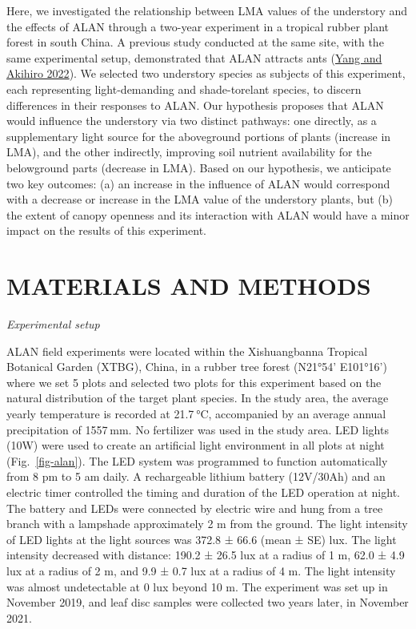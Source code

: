 \documentclass[
  12pt,
  letterpaper,
  DIV=11,
  numbers=noendperiod]{scrartcl}
\begin{document}
Here, we investigated the relationship between LMA values of the
understory and the effects of ALAN through a two-year experiment in a
tropical rubber plant forest in south China. A previous study conducted
at the same site, with the same experimental setup, demonstrated that
ALAN attracts ants (\protect\hyperlink{ref-Yang2022}{Yang and Akihiro
2022}). We selected two understory species as subjects of this
experiment, each representing light-demanding and shade-torelant
species, to discern differences in their responses to ALAN. Our
hypothesis proposes that ALAN would influence the understory via two
distinct pathways: one directly, as a supplementary light source for the
aboveground portions of plants (increase in LMA), and the other
indirectly, improving soil nutrient availability for the belowground
parts (decrease in LMA). Based on our hypothesis, we anticipate two key
outcomes: (a) an increase in the influence of ALAN would correspond with
a decrease or increase in the LMA value of the understory plants, but
(b) the extent of canopy openness and its interaction with ALAN would
have a minor impact on the results of this experiment.

\hypertarget{materials-and-methods}{%
\section{MATERIALS AND METHODS}\label{materials-and-methods}}

\emph{Experimental setup}

ALAN field experiments were located within the Xishuangbanna Tropical
Botanical Garden (XTBG), China, in a rubber tree forest (N21°54'
E101°16') where we set 5 plots and selected two plots for this
experiment based on the natural distribution of the target plant
species. In the study area, the average yearly temperature is recorded
at 21.7 °C, accompanied by an average annual precipitation of 1557 mm.
No fertilizer was used in the study area. LED lights (10W) were used to
create an artificial light environment in all plots at night
(Fig.~\ref{fig-alan}). The LED system was programmed to function
automatically from 8 pm to 5 am daily. A rechargeable lithium battery
(12V/30Ah) and an electric timer controlled the timing and duration of
the LED operation at night. The battery and LEDs were connected by
electric wire and hung from a tree branch with a lampshade approximately
2 m from the ground. The light intensity of LED lights at the light
sources was 372.8 ± 66.6 (mean ± SE) lux. The light intensity decreased
with distance: 190.2 ± 26.5 lux at a radius of 1 m, 62.0 ± 4.9 lux at a
radius of 2 m, and 9.9 ± 0.7 lux at a radius of 4 m. The light intensity
was almost undetectable at 0 lux beyond 10 m. The experiment was set up
in November 2019, and leaf disc samples were collected two years later,
in November 2021.
\end{document}

